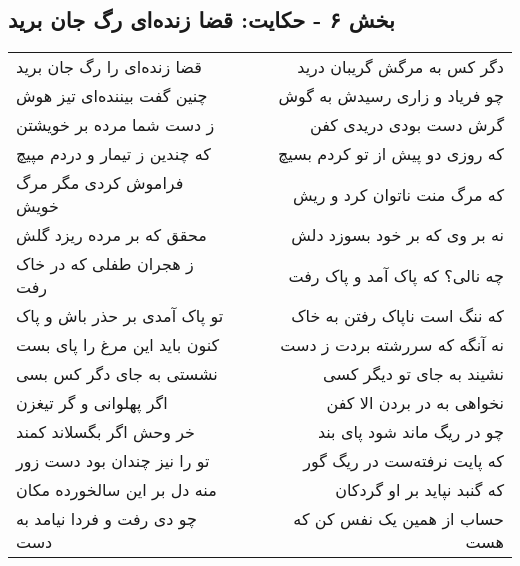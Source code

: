 \begin{center}
\section*{بخش ۶ - حکایت: قضا زنده‌ای رگ جان برید}
\label{sec:006}
\begin{longtable}{l p{0.5cm} r}
قضا زنده‌ای را رگ جان برید
&&
دگر کس به مرگش گریبان درید
\\
چنین گفت بیننده‌ای تیز هوش
&&
چو فریاد و زاری رسیدش به گوش
\\
ز دست شما مرده بر خویشتن
&&
گرش دست بودی دریدی کفن
\\
که چندین ز تیمار و دردم مپیچ
&&
که روزی دو پیش از تو کردم بسیچ
\\
فراموش کردی مگر مرگ خویش
&&
که مرگ منت ناتوان کرد و ریش
\\
محقق که بر مرده ریزد گلش
&&
نه بر وی که بر خود بسوزد دلش
\\
ز هجران طفلی که در خاک رفت
&&
چه نالی؟ که پاک آمد و پاک رفت
\\
تو پاک آمدی بر حذر باش و پاک
&&
که ننگ است ناپاک رفتن به خاک
\\
کنون باید این مرغ را پای بست
&&
نه آنگه که سررشته بردت ز دست
\\
نشستی به جای دگر کس بسی
&&
نشیند به جای تو دیگر کسی
\\
اگر پهلوانی و گر تیغزن
&&
نخواهی به در بردن الا کفن
\\
خر وحش اگر بگسلاند کمند
&&
چو در ریگ ماند شود پای بند
\\
تو را نیز چندان بود دست زور
&&
که پایت نرفته‌ست در ریگ گور
\\
منه دل بر این سالخورده مکان
&&
که گنبد نپاید بر او گردکان
\\
چو دی رفت و فردا نیامد به دست
&&
حساب از همین یک نفس کن که هست
\\
\end{longtable}
\end{center}

